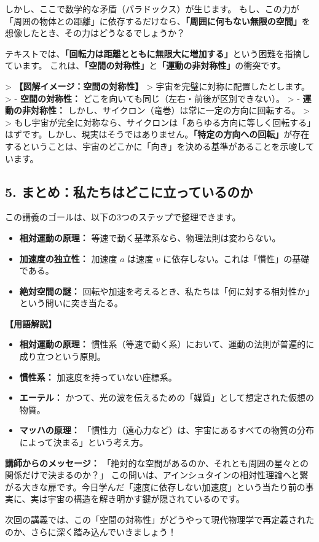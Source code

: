 \documentclass[a4paper,11pt,openany]{ltjsbook}
\begin{document}
\begin{lecturebox}
しかし、ここで数学的な矛盾（パラドックス）が生じます。
もし、この力が「周囲の物体との距離」に依存するだけなら、\textbf{「周囲に何もない無限の空間」}を想像したとき、その力はどうなるでしょうか？

テキストでは、\textbf{「回転力は距離とともに無限大に増加する」}という困難を指摘しています。
これは、\textbf{「空間の対称性」}と\textbf{「運動の非対称性」}の衝突です。

> \textbf{【図解イメージ：空間の対称性】}
> 宇宙を完璧に対称に配置したとします。
> - \textbf{空間の対称性：} どこを向いても同じ（左右・前後が区別できない）。
> - \textbf{運動の非対称性：} しかし、サイクロン（竜巻）は常に一定の方向に回転する。
>
> もし宇宙が完全に対称なら、サイクロンは「あらゆる方向に等しく回転する」はずです。しかし、現実はそうではありません。\textbf{「特定の方向への回転」}が存在するということは、宇宙のどこかに「向き」を決める基準があることを示唆しています。

\subsection*{5. まとめ：私たちはどこに立っているのか}

この講義のゴールは、以下の3つのステップで整理できます。

\begin{itemize}[leftmargin=2em]
\item \textbf{相対運動の原理：} 等速で動く基準系なら、物理法則は変わらない。
\item \textbf{加速度の独立性：} 加速度 $a$ は速度 $v$ に依存しない。これは「慣性」の基礎である。
\item \textbf{絶対空間の謎：} 回転や加速を考えるとき、私たちは「何に対する相対性か」という問いに突き当たる。
\end{itemize}

\textbf{【用語解説】}
\begin{itemize}[leftmargin=2em]
\item \textbf{相対運動の原理：} 慣性系（等速で動く系）において、運動の法則が普遍的に成り立つという原則。
\item \textbf{慣性系：} 加速度を持っていない座標系。
\item \textbf{エーテル：} かつて、光の波を伝えるための「媒質」として想定された仮想の物質。
\item \textbf{マッハの原理：} 「慣性力（遠心力など）は、宇宙にあるすべての物質の分布によって決まる」という考え方。
\end{itemize}

\textbf{講師からのメッセージ：}
「絶対的な空間があるのか、それとも周囲の星々との関係だけで決まるのか？」
この問いは、アインシュタインの相対性理論へと繋がる大きな扉です。今日学んだ「速度に依存しない加速度」という当たり前の事実に、実は宇宙の構造を解き明かす鍵が隠されているのです。

次回の講義では、この「空間の対称性」がどうやって現代物理学で再定義されたのか、さらに深く踏み込んでいきましょう！
\end{lecturebox}
\end{document}
